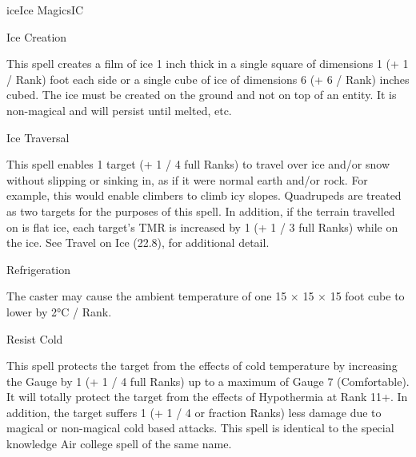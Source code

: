 \begin{College}[1.5]{ice}{Ice Magics}{IC}
\begin{spell}[G-3]{Ice Creation}
\begin{effects}
This spell creates a film of ice 1 inch thick in a single square of
dimensions 1 (+ 1 / Rank) foot each side or a single cube of ice of
dimensions 6 (+ 6 / Rank) inches cubed. The ice must be created on the
ground and not on top of an entity.  It is non-magical and will
persist until melted, etc.
\end{effects}
\end{spell}

\begin{spell}[G-4]{Ice Traversal}
\begin{effects}
This spell enables 1 target (+ 1 / 4 full Ranks) to travel over ice
and/or snow without slipping or sinking in, as if it were normal earth
and/or rock. For example, this would enable climbers to climb icy
slopes.  Quadrupeds are treated as two targets for the purposes of
this spell.  In addition, if the terrain travelled on is flat ice,
each target’s TMR is increased by 1 (+ 1 / 3 full Ranks) while on the
ice.  See Travel on Ice (22.8), for additional detail.
\end{effects}
\end{spell}

\begin{spell}[G-5]{Refrigeration}
\begin{effects}
The caster may cause the ambient temperature of one 15 × 15 × 15 foot
cube to lower by 2°C / Rank.
\end{effects}
\end{spell}

\begin{spell}[G-6]{Resist Cold}
\begin{effects}
This spell protects the target from the effects of cold temperature by
increasing the Gauge by 1 (+ 1 / 4 full Ranks) up to a maximum of
Gauge 7 (Comfortable). It will totally protect the target from the
effects of Hypothermia at Rank 11+.  In addition, the target suffers 1
(+ 1 / 4 or fraction Ranks) less damage due to magical or non-magical
cold based attacks.  This spell is identical to the special knowledge
Air college spell of the same name.
\end{effects}
\end{spell}


\end{College}

